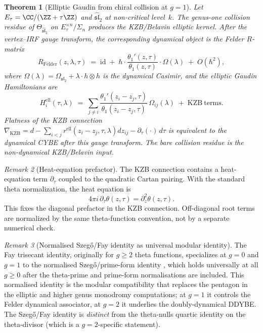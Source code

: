 \documentclass[11pt]{article}
\theoremstyle{plain}
\newtheorem{theorem}{Theorem}[section]
\theoremstyle{definition}
\theoremstyle{remark}
\newtheorem{remark}[theorem]{Remark}
\newcommand{\fsl}{\mathfrak{sl}}
\numberwithin{equation}{section}
\begin{document}
\begin{theorem}[Elliptic Gaudin from chiral collision at
$g=1$]\label{thm:elliptic-gaudin}
Let $E_\tau = \CC/(\ZZ + \tau\ZZ)$ and $\widehat{\fsl}_2$ at
non-critical level~$k$. The genus-one collision residue of
$\Theta_{\widehat{\fsl}_2}$ on $E_\tau^{\times n} / \Sigma_n$
produces the KZB/Belavin elliptic kernel. After the vertex--IRF gauge
transform, the corresponding dynamical object is the Felder
$R$-matrix
\[
 R_{\mathrm{Felder}}(z, \lambda, \tau) \;=\;
 \mathrm{id} \;+\; \hbar \cdot \frac{\theta_1'(z, \tau)}
 {\theta_1(z, \tau)} \cdot \Omega(\lambda) \;+\; O(\hbar^2),
\]
where $\Omega(\lambda) = \Omega_{\fsl_2} +
\lambda \cdot h \otimes h$ is the dynamical Casimir, and the elliptic
Gaudin Hamiltonians are
\[
 H_i^{\mathrm{ell}}(\tau, \lambda) \;=\;
 \sum_{j\neq i} \frac{\theta_1'(z_i - z_j, \tau)}
 {\theta_1(z_i - z_j, \tau)}\,\Omega_{ij}(\lambda) \;+\;
 \mathrm{KZB\ terms}.
\]
Flatness of the KZB connection $\nabla_{\mathrm{KZB}} = d -
\sum_{i<j} r^{\mathrm{ell}}(z_i - z_j, \tau, \lambda) dz_{ij} -
\partial_\tau(\cdot)\,d\tau$ is equivalent to the dynamical CYBE
after this gauge transform. The bare collision residue is the
non-dynamical KZB/Belavin input.
\end{theorem}

\begin{remark}[Heat-equation prefactor]
\label{rem:heat-prefactor}
The KZB connection contains a heat-equation term $\partial_\tau$
coupled to the quadratic Cartan pairing. With the standard theta
normalization, the heat equation is
\[
  4\pi i\,\partial_\tau \theta(z,\tau)=\partial_z^2\theta(z,\tau).
\]
This fixes the diagonal prefactor in the KZB connection. Off-diagonal
root terms are normalized by the same theta-function convention, not
by a separate numerical check.
\end{remark}

\begin{remark}[Normalised Szeg\H{o}/Fay identity as universal modular
identity]\label{rem:szego-fay}
The Fay trisecant identity, originally for $g \geq 2$ theta
functions, specializes at $g = 0$ and $g = 1$ to the normalised
Szeg\H{o}/prime-form identity \cite[Cor.~2.5]{Fay1973ThetaFunctions},
which holds universally at all $g \geq 0$ after the theta-prime and
prime-form normalisations are included. This normalised identity is
the modular compatibility that replaces the pentagon in the elliptic
and higher genus monodromy computations; at $g = 1$ it controls the
Felder dynamical associator, at $g = 2$ it underlies the
doubly-dynamical DDYBE. The Szeg\H{o}/Fay identity is \emph{distinct}
from the theta-nulls quartic identity on the theta-divisor (which is
a $g=2$-specific statement).
\end{remark}
\end{document}
